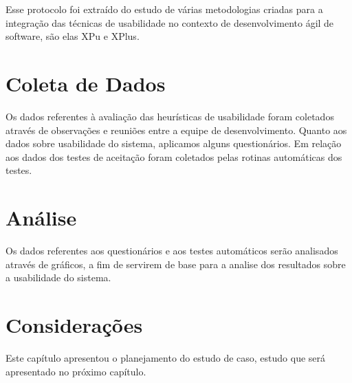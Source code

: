 Esse protocolo foi extraído do estudo de várias metodologias criadas para a integração das técnicas de usabilidade no contexto de desenvolvimento ágil de software, são elas XPu e XPlus.
 
\section{Coleta de Dados}

Os dados referentes à avaliação das heurísticas de usabilidade foram coletados através de observações e reuniões entre a equipe de desenvolvimento. Quanto aos dados sobre usabilidade do sistema, aplicamos alguns questionários. Em relação aos dados dos testes de aceitação foram coletados pelas rotinas automáticas dos testes.

\section{Análise}

Os dados referentes aos questionários e aos testes automáticos serão analisados através de gráficos, a fim de servirem de base para a analise dos resultados sobre a usabilidade do sistema.

\section{Considerações}

Este capítulo apresentou o planejamento do estudo de caso, estudo que será apresentado no próximo capítulo.